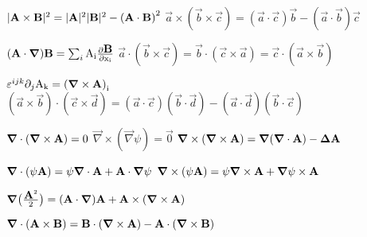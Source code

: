 \squishlist

\item $|\vec{\rm{A}} \times \vec{\rm{B}}|^2 = |\vec{\rm{A}}|^2|\vec{\rm{B}}|^2 - \left(\vec{\rm{A}}\cdot\vec{\rm{B}}\right)^2 $ \squishsep $\vec{a} \times (\vec{b} \times \vec{c}) = (\vec{a} \cdot \vec{c})\vec{b} - (\vec{a} \cdot \vec{b})\vec{c}$


\item $(\vec{\rm{A}} \cdot \vec \nabla)\vec{\rm{B}} = \sum_{i} \rm{A}_i\frac{\partial \vec{\rm{B}}}{\partial x_i}$ \squishsep $\vec{a}\cdot(\vec{b}\times\vec{c})=\vec{b}\cdot(\vec{c}\times\vec{a})=\vec{c}\cdot(\vec{a}\times\vec{b})$

\item $\varepsilon^{ijk}\partial_j\rm{A}_k = \left(\vec{\nabla} \times \vec{\rm{A}} \right)_i$ \squishsep $(\vec{a} \times \vec{b}) \cdot (\vec{c} \times \vec{d}) = (\vec{a}\cdot\vec{c})(\vec{b}\cdot\vec{d}) - (\vec{a}\cdot\vec{d})(\vec{b}\cdot\vec{c})$


\item $\vec{\nabla}\cdot (\vec{\nabla}\times\vec{\rm{A}})=0$ \squishsep $\vec{\nabla} \times (\vec{\nabla}\psi)=\vec{0}$ \squishsep $\vec{\nabla} \times (\vec{\nabla} \times \vec{\rm{A}}) = \vec{\nabla} (\vec{\nabla} \cdot \vec{\rm{A}}) - \vec \Delta \vec{\rm{A}}$

\item $\vec{\nabla} \cdot (\psi\vec{\rm{A}}) = \psi\vec{\nabla}\cdot\vec{\rm{A}} + \vec{\rm{A}}\cdot\vec{\nabla}\psi$ \squishsep $\vec{\nabla} \times (\psi\vec{\rm{A}}) = \psi \vec{\nabla} \times \vec{\rm{A}} + \vec{\nabla}\psi \times \vec{\rm{A}}$

\item $\vec \nabla \big( \frac{\vec{\rm{A}}^2}{2} \big) = (\vec{\rm{A}} \cdot \vec \nabla)\vec{\rm{A}} + \vec{\rm{A}} \times (\vec \nabla \times \vec{\rm{A}})$

\item $\vec \nabla \cdot (\vec{\rm{A}} \times \vec{\rm{B}}) = \vec{\rm{B}} \cdot (\vec \nabla \times \vec{\rm{A}}) - \vec{\rm{A}} \cdot (\vec \nabla \times \vec{\rm{B}})$

